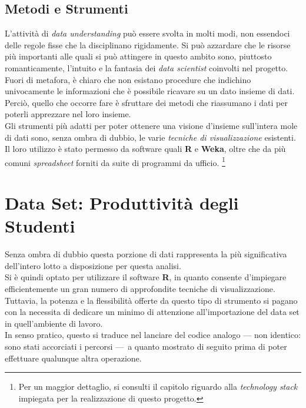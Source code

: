         \subsection{Metodi e Strumenti}

            L'attività di \textit{data understanding} può essere svolta in molti modi, non essendoci delle regole fisse che la disciplinano rigidamente. Si può azzardare che le risorse più importanti alle quali si può attingere in questo ambito sono, piuttosto romanticamente, l'intuito e la fantasia dei \textit{data scientist} coinvolti nel progetto. Fuori di metafora, è chiaro che non esistano procedure che indichino univocamente le informazioni che è possibile ricavare su un dato insieme di dati. Perciò, quello che occorre fare è sfruttare dei metodi che riassumano i dati per poterli apprezzare nel loro insieme. \\

            Gli strumenti più adatti per poter ottenere una visione d'insieme sull'intera mole di dati sono, senza ombra di dubbio, le varie \textit{tecniche di visualizzazione} esistenti. Il loro utilizzo è stato permesso da software quali \textbf{R} e \textbf{Weka}, oltre che da più comuni \textit{spreadsheet} forniti da suite di programmi da ufficio. \footnote{Per un maggior dettaglio, si consulti il capitolo riguardo alla \textit{technology stack} impiegata per la realizzazione di questo progetto.}

    \section{Data Set: Produttività degli Studenti}

        Senza ombra di dubbio questa porzione di dati rappresenta la più significativa dell'intero lotto a disposizione per questa analisi. \\

        Si è quindi optato per utilizzare il software \textbf{R}, in quanto consente d'impiegare efficientemente un gran numero di approfondite tecniche di visualizzazione. Tuttavia, la potenza e la flessibilità offerte da questo tipo di strumento si pagano con la necessita di dedicare un minimo di attenzione all'importazione del data set in quell'ambiente di lavoro. \\

        In senso pratico, questo si traduce nel lanciare del codice analogo \footnotesize{--- non identico: sono stati accorciati i percorsi ---}\normalsize\ a quanto mostrato di seguito prima di poter effettuare qualunque altra operazione. \\

